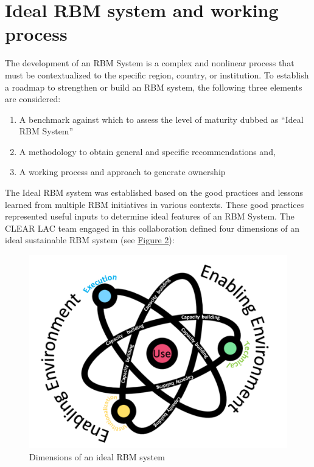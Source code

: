 \documentclass[
]{book}
\providecommand{\tightlist}{%
  \setlength{\itemsep}{0pt}\setlength{\parskip}{0pt}}
\begin{document}
\hypertarget{ideal-rbm-system-and-working-process}{%
\section{Ideal RBM system and working process}\label{ideal-rbm-system-and-working-process}}

The development of an RBM System is a complex and nonlinear process that must be contextualized to the specific region, country, or institution. To establish a roadmap to strengthen or build an RBM system, the following three elements are considered:

\begin{enumerate}
\def\labelenumi{\arabic{enumi}.}
\tightlist
\item
  A benchmark against which to assess the level of maturity dubbed as ``Ideal RBM System''
\item
  A methodology to obtain general and specific recommendations and,
\item
  A working process and approach to generate ownership
\end{enumerate}

The Ideal RBM system was established based on the good practices and lessons learned from multiple RBM initiatives in various contexts. These good practices represented useful inputs to determine ideal features of an RBM System. The CLEAR LAC team engaged in this collaboration defined four dimensions of an ideal sustainable RBM system (see \protect\hyperlink{fig:figure2}{Figure 2}):

\begin{figure}
\includegraphics[width=1\linewidth]{./images/figure_2} \caption{Dimensions of an ideal RBM system}\label{fig:figure2}
\end{figure}
\end{document}
